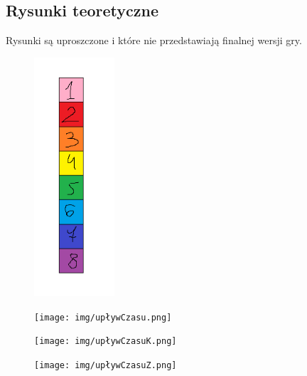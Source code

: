\documentclass{article}
\begin{document}
\subsection{Rysunki teoretyczne}

Rysunki są uproszczone i które nie przedstawiają finalnej wersji gry.

\begin{figure} [hbt!]
    \includegraphics[width=3cm,center]{img/wartosciKomorek.png}
\end{figure}

\clearpage

\begin{figure} [hbt!]
    \texttt{[image: img/upływCzasu.png]}
\end{figure}

\clearpage

\begin{figure} [hbt!]
    \texttt{[image: img/upływCzasuK.png]}
\end{figure}


\begin{figure} [hbt!]
    \texttt{[image: img/upływCzasuZ.png]}
\end{figure}
\end{document}
